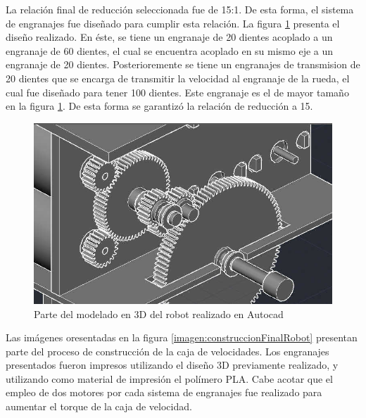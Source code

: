 La relación final de reducción seleccionada fue de  15:1. De esta forma, el sistema de engranajes fue diseñado para cumplir esta relación. La figura \ref{imagen:disenoEngranajesAutocad} presenta el diseño realizado. En éste, se tiene un engranaje de 20 dientes acoplado a un engranaje de 60 dientes, el cual se encuentra acoplado en su mismo eje a un engranaje de 20 dientes. Posterioremente se tiene un engranajes de transmision de 20 dientes que se encarga de transmitir la velocidad al engranaje de la rueda, el cual fue diseñado para tener 100 dientes. Este engranaje es el de mayor tamaño en la figura \ref{imagen:disenoEngranajesAutocad}. De esta forma se garantizó la relación de reducción a 15.

\begin{figure}[H]
	\centering
	\includegraphics[width=0.7\linewidth]{imagenes/prototipo/EngranajesAutocad}
	\caption{Parte del modelado en 3D del robot realizado en Autocad}
	\label{imagen:disenoEngranajesAutocad}
\end{figure}


Las imágenes oresentadas en la figura \ref{imagen:construccionFinalRobot} presentan parte del proceso de construcción de la caja de velocidades. Los engranajes presentados fueron impresos utilizando el diseño 3D previamente realizado, y utilizando como material de impresión el polímero PLA. Cabe acotar que el empleo de dos motores por cada sistema de engranajes fue realizado para aumentar el torque de la caja de velocidad.

